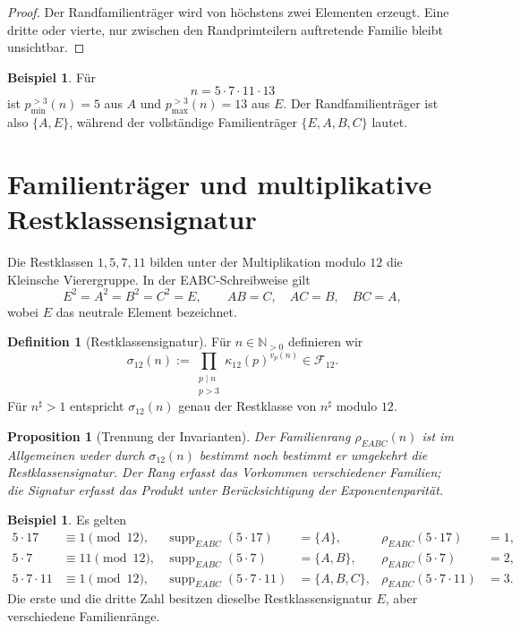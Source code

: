 \documentclass[11pt,a4paper,reqno]{amsart}
\newtheorem{proposition}[theorem]{Proposition}
\theoremstyle{definition}
\newtheorem{definition}[theorem]{Definition}
\newtheorem{example}[theorem]{Beispiel}
\theoremstyle{remark}
\newcommand{\Npos}{\mathbb{N}_{>0}}
\newcommand{\Fam}{\mathcal{F}_{12}}
\newcommand{\suppE}{\operatorname{supp}_{EABC}}
\newcommand{\rankE}{\rho_{EABC}}
\begin{document}
\begin{proof}
Der Randfamilienträger wird von höchstens zwei Elementen erzeugt. Eine dritte oder vierte, nur zwischen den Randprimteilern auftretende Familie bleibt unsichtbar.
\end{proof}

\begin{example}
Für
\[
n=5\cdot7\cdot11\cdot13
\]
ist $p_{\min}^{>3}(n)=5$ aus $A$ und $p_{\max}^{>3}(n)=13$ aus $E$. Der Randfamilienträger ist also $\{A,E\}$, während der vollständige Familienträger $\{E,A,B,C\}$ lautet.
\end{example}

\section{Familienträger und multiplikative Restklassensignatur}

Die Restklassen $1,5,7,11$ bilden unter der Multiplikation modulo $12$ die Kleinsche Vierergruppe. In der EABC-Schreibweise gilt
\[
E^2=A^2=B^2=C^2=E,
\qquad
AB=C,\quad AC=B,\quad BC=A,
\]
wobei $E$ das neutrale Element bezeichnet.

\begin{definition}[Restklassensignatur]
Für $n\in\Npos$ definieren wir
\[
\sigma_{12}(n)
:=\prod_{\substack{p\mid n\\p>3}}
\kappa_{12}(p)^{v_p(n)}\in\Fam.
\]
Für $n^{\sharp}>1$ entspricht $\sigma_{12}(n)$ genau der Restklasse von $n^{\sharp}$ modulo $12$.
\end{definition}

\begin{proposition}[Trennung der Invarianten]
Der Familienrang $\rankE(n)$ ist im Allgemeinen weder durch $\sigma_{12}(n)$ bestimmt noch bestimmt er umgekehrt die Restklassensignatur. Der Rang erfasst das Vorkommen verschiedener Familien; die Signatur erfasst das Produkt unter Berücksichtigung der Exponentenparität.
\end{proposition}

\begin{example}
Es gelten
\begin{align*}
5\cdot17&\equiv1\pmod{12},
&\suppE(5\cdot17)&=\{A\},
&\rankE(5\cdot17)&=1,\\
5\cdot7&\equiv11\pmod{12},
&\suppE(5\cdot7)&=\{A,B\},
&\rankE(5\cdot7)&=2,\\
5\cdot7\cdot11&\equiv1\pmod{12},
&\suppE(5\cdot7\cdot11)&=\{A,B,C\},
&\rankE(5\cdot7\cdot11)&=3.
\end{align*}
Die erste und die dritte Zahl besitzen dieselbe Restklassensignatur $E$, aber verschiedene Familienränge.
\end{example}
\end{document}
